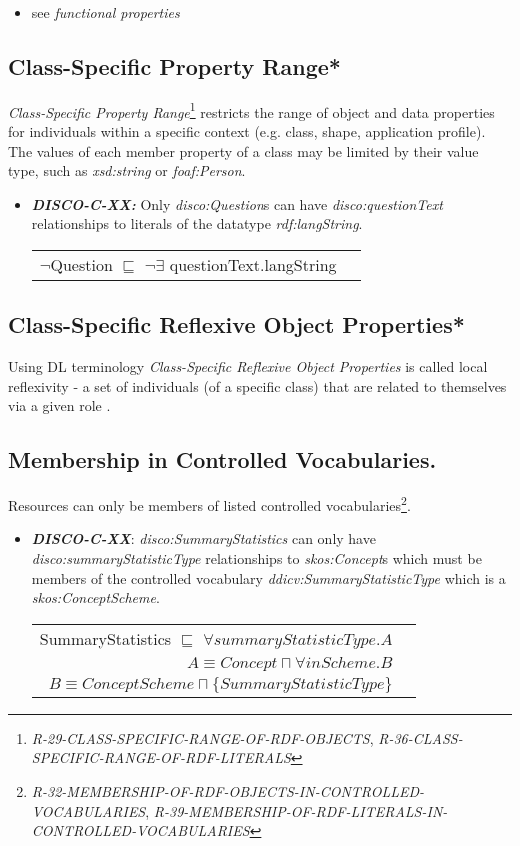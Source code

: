 \documentclass{llncs}
\newenvironment{DL}{
  \vspace{0cm}
  \begin{tabular}{r l}

}{
  \end{tabular}
}
\begin{document}
\begin{itemize}
	\item see \emph{functional properties}
\end{itemize}

\subsection{Class-Specific Property Range*}		

{\em Class-Specific Property Range}\footnote{{\em R-29-CLASS-SPECIFIC-RANGE-OF-RDF-OBJECTS}, {\em R-36-CLASS-SPECIFIC-RANGE-OF-RDF-LITERALS}} restricts the range of object and data properties for individuals within a specific context (e.g. class, shape, application profile).
The values of each member property of a class may be limited by their value type, such as \emph{xsd:string} or \emph{foaf:Person}. 

\begin{itemize}
	\item \textbf{{\em DISCO-C-XX:}} 
Only {\em disco:Question}s can have {\em disco:questionText} relationships to literals of the datatype {\em rdf:langString}.

\begin{DL}
$\neg$Question $\sqsubseteq$ $\neg\exists$ questionText.langString
\end{DL}
\end{itemize}

\subsection{Class-Specific Reflexive Object Properties*}

Using DL terminology \emph{Class-Specific Reflexive Object Properties} is called local reflexivity - a set of individuals (of a specific class) that are related to themselves via a given role \cite{Kroetzsch2012}.

\subsection{Membership in Controlled Vocabularies.}

Resources can only be members of listed controlled vocabularies\footnote{{\em R-32-MEMBERSHIP-OF-RDF-OBJECTS-IN-CONTROLLED-VOCABULARIES}, 
{\em R-39-MEMBERSHIP-OF-RDF-LITERALS-IN-CONTROLLED-VOCABULARIES}}.

\begin{itemize}
	\item \textbf{{\em DISCO-C-XX}}:
{\em disco:SummaryStatistics} can only have {\em disco:summaryStatisticType} relationships to {\em skos:Concept}s which must be members of the controlled vocabulary {\em ddicv:SummaryStatisticType} which is a {\em skos:ConceptScheme}.

\begin{DL}
SummaryStatistics $\sqsubseteq$ $\forall summaryStatisticType.A$ \\
$A \equiv Concept \sqcap \forall inScheme . B$ \\
$B \equiv ConceptScheme \sqcap \{SummaryStatisticType\}$
\end{DL}
\end{itemize}
\end{document}
